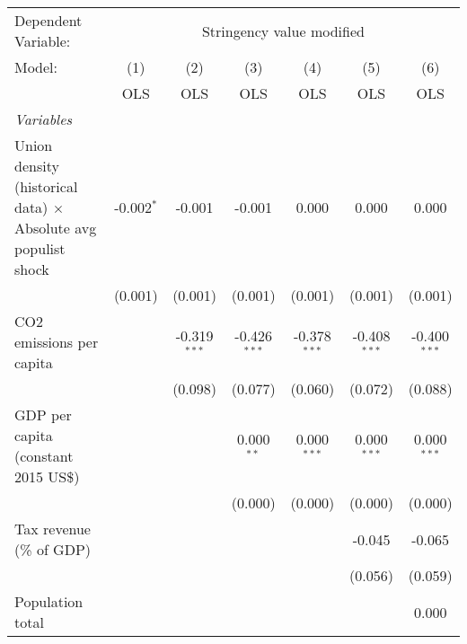 
\begingroup
\centering
\begin{tabular}{lcccccc}
   \toprule
   Dependent Variable: & \multicolumn{6}{c}{Stringency value modified}\\
   Model:                                                                & (1)          & (2)            & (3)            & (4)            & (5)            & (6)\\  
                                                                         &  OLS         & OLS            & OLS            & OLS            & OLS            & OLS\\  
   \midrule
   \emph{Variables}\\
   Union density (historical data) $\times$ Absolute avg populist shock  & -0.002$^{*}$ & -0.001         & -0.001         & 0.000          & 0.000          & 0.000\\   
                                                                         & (0.001)      & (0.001)        & (0.001)        & (0.001)        & (0.001)        & (0.001)\\   
   CO2 emissions per capita                                              &              & -0.319$^{***}$ & -0.426$^{***}$ & -0.378$^{***}$ & -0.408$^{***}$ & -0.400$^{***}$\\   
                                                                         &              & (0.098)        & (0.077)        & (0.060)        & (0.072)        & (0.088)\\   
   GDP per capita (constant 2015 US\$)                                   &              &                & 0.000$^{**}$   & 0.000$^{***}$  & 0.000$^{***}$  & 0.000$^{***}$\\   
                                                                         &              &                & (0.000)        & (0.000)        & (0.000)        & (0.000)\\   
   Tax revenue (\% of GDP)                                               &              &                &                &                & -0.045         & -0.065\\   
                                                                         &              &                &                &                & (0.056)        & (0.059)\\   
   Population total                                                      &              &                &                &                &                & 0.000\\   

\end{tabular}
